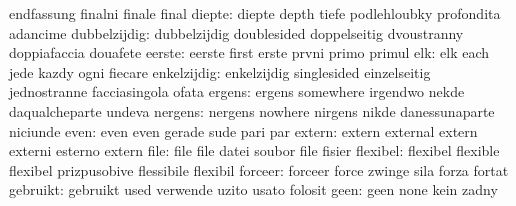                            endfassung                finalni
                           finale                    final
                   diepte: diepte                    depth
                           tiefe                     podlehloubky
                           profondita                adancime
             dubbelzijdig: dubbelzijdig              doublesided
                           doppelseitig              dvoustranny
                           doppiafaccia              douafete
                   eerste: eerste                    first
                           erste                     prvni
                           primo                     primul
                      elk: elk                       each
                           jede                      kazdy
                           ogni                      fiecare
              enkelzijdig: enkelzijdig               singlesided
                           einzelseitig              jednostranne
                           facciasingola             ofata
                   ergens: ergens                    somewhere
                           irgendwo                  nekde
                           daqualcheparte            undeva
                  nergens: nergens                   nowhere
                           nirgens                   nikde
                           danessunaparte            niciunde
                     even: even                      even
                           gerade                    sude
                           pari                      par
                   extern: extern                    external
                           extern                    externi
                           esterno                   extern
                     file: file                      file
                           datei                     soubor
                           file                      fisier
                 flexibel: flexibel                  flexible
                           flexibel                  prizpusobive
                           flessibile                flexibil
                  forceer: forceer                   force
                           zwinge                    sila
                           forza                     fortat
                 gebruikt: gebruikt                  used
                           verwende                  uzito
                           usato                     folosit
                     geen: geen                      none
                           kein                      zadny
